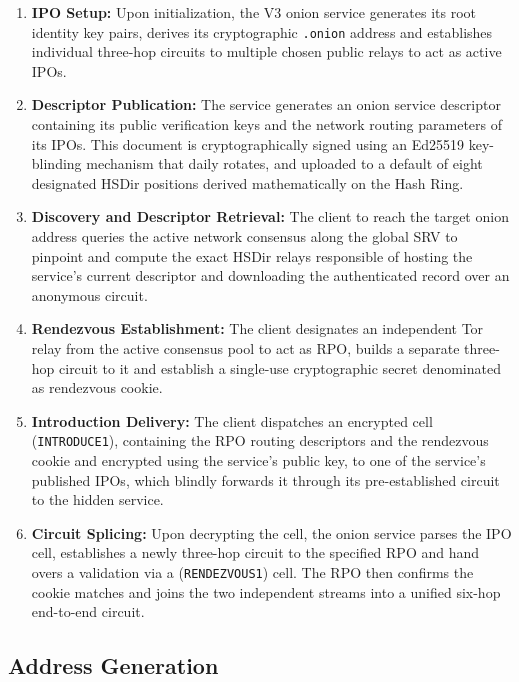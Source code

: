 \documentclass[conference]{IEEEtran}
\begin{document}
\begin{enumerate}
    \item \textbf{IPO Setup:} Upon initialization, the V3 onion service generates its root identity key pairs, derives its cryptographic \texttt{.onion} address and establishes individual three-hop circuits to multiple chosen public relays to act as active IPOs.
    \item \textbf{Descriptor Publication:} The service generates an onion service descriptor containing its public verification keys and the network routing parameters of its IPOs. This document is cryptographically signed using an Ed25519 key-blinding mechanism that daily rotates, and uploaded to a default of eight designated HSDir positions derived mathematically on the Hash Ring.
    \item \textbf{Discovery and Descriptor Retrieval:} The client to reach the target onion address queries the active network consensus along the global SRV to pinpoint and compute the exact HSDir relays responsible of hosting the service's current descriptor and downloading the authenticated record over an anonymous circuit.
    \item \textbf{Rendezvous Establishment:} The client designates an independent Tor relay from the active consensus pool to act as RPO, builds a separate three-hop circuit to it and establish a single-use cryptographic secret denominated as rendezvous cookie.
    \item \textbf{Introduction Delivery:} The client dispatches an encrypted cell (\texttt{INTRODUCE1}), containing the RPO routing descriptors and the rendezvous cookie and encrypted using the service's public key, to one of the service's published IPOs, which blindly forwards it through its pre-established circuit to the hidden service.
    \item \textbf{Circuit Splicing:} Upon decrypting the cell, the onion service parses the IPO cell, establishes a newly three-hop circuit to the specified RPO and hand overs a validation via a (\texttt{RENDEZVOUS1}) cell. The RPO then confirms the cookie matches and joins the two independent streams into a unified six-hop end-to-end circuit.
\end{enumerate}

\subsection{Address Generation}
\end{document}
